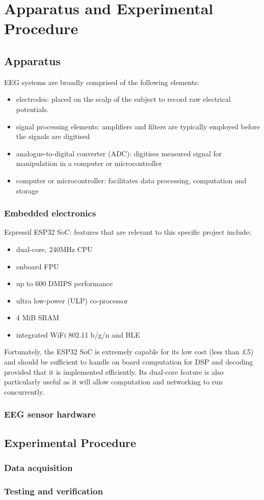 \chapter{Apparatus and Experimental Procedure}
\label{chapter:experimental-procedure}

\graphicspath{ {report/Chapter4/assets/} } 

\section{Apparatus}

EEG systems are broadly comprised of the following elements:
\begin{itemize}
    \item electrodes: placed on the scalp of the subject to record raw electrical potentials. 
    \item signal processing elements: amplifiers and filters are typically employed before the signals are digitised
    \item analogue-to-digital converter (ADC): digitises measured signal for manipulation in a computer or microcontroller
    \item computer or microcontroller: facilitates data processing, computation and storage
\end{itemize}

\subsection{Embedded electronics}
Espressif ESP32 SoC: features that are relevant to this specific project include: 
\begin{itemize}
    \item dual-core, 240MHz CPU
    \item onboard FPU
    \item up to 600 DMIPS performance
    \item ultra low-power (ULP) co-processor
    \item 4 MiB SRAM
    \item integrated WiFi 802.11 b/g/n and BLE
\end{itemize}
Fortunately, the ESP32 SoC is extremely capable for its low cost (less than £5) and should be sufficient to handle on board computation for DSP and decoding provided that it is implemented efficiently. Its dual-core feature is also particularly useful as it will allow computation and networking to run concurrently. 
\subsection{EEG sensor hardware}

\section{Experimental Procedure}
\subsection{Data acquisition}
\subsection{Testing and verification}